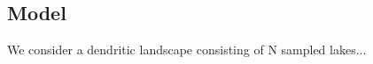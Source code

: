 \documentclass[12pt]{article}
\begin{document}







\subsection{Model}
We consider a dendritic landscape consisting of N sampled lakes...
\end{document}
